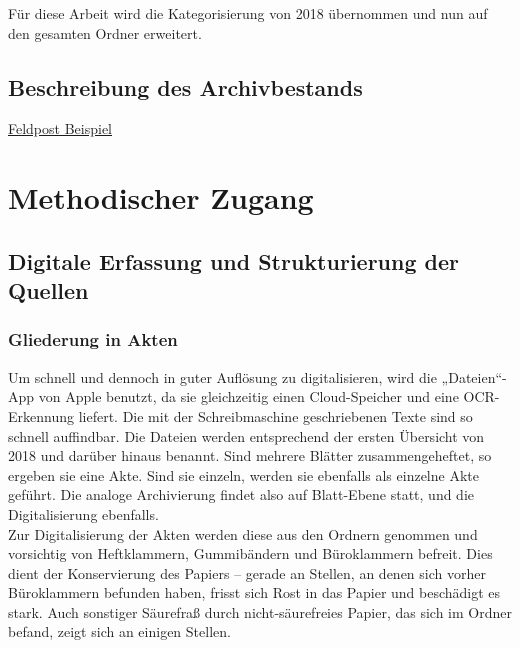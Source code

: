\documentclass[12pt, a4paper, ngerman, bidi=default]{article}
\begin{document}
Für diese Arbeit wird die Kategorisierung von 2018 übernommen und nun auf den gesamten Ordner erweitert. 

\subsection{Beschreibung des Archivbestands}
\newpage

\href{https://free.iiifhosting.com/iiif/959173f8d808ab12ad7847917f79e0e4bc974ebce0040a07afd4b8be3f10c234/}{Feldpost Beispiel}

    
    
    \section{Methodischer Zugang}
    
    \subsection{Digitale Erfassung und Strukturierung der Quellen}
    \subsubsection{Gliederung in Akten}

    Um schnell und dennoch in guter Auflösung zu digitalisieren, wird die „Dateien“-App von Apple benutzt, da sie gleichzeitig einen Cloud-Speicher und eine OCR-Erkennung liefert. Die mit der Schreibmaschine geschriebenen Texte sind so schnell auffindbar. Die Dateien werden entsprechend der ersten Übersicht von 2018 und darüber hinaus benannt. Sind mehrere Blätter zusammengeheftet, so ergeben sie eine Akte. Sind sie einzeln, werden sie ebenfalls als einzelne Akte geführt. Die analoge Archivierung findet also auf Blatt-Ebene statt, und die Digitalisierung ebenfalls.\\
    Zur Digitalisierung der Akten werden diese aus den Ordnern genommen und vorsichtig von Heftklammern, Gummibändern und Büroklammern befreit. Dies dient der Konservierung des Papiers – gerade an Stellen, an denen sich vorher Büroklammern befunden haben, frisst sich Rost in das Papier und beschädigt es stark. Auch sonstiger Säurefraß durch nicht-säurefreies Papier, das sich im Ordner befand, zeigt sich an einigen Stellen.\\
\end{document}
